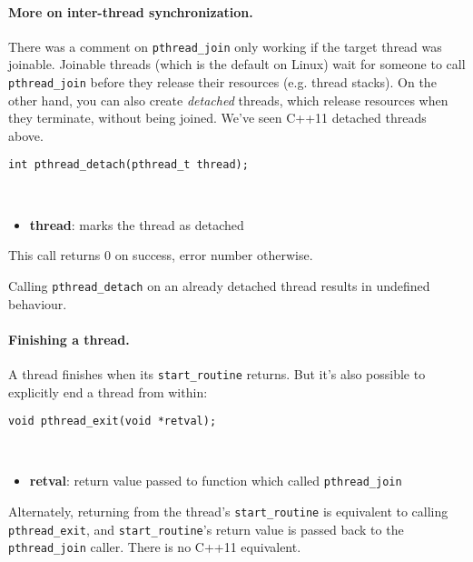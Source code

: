 \documentclass[11pt]{article}
\begin{document}
\paragraph{More on inter-thread synchronization.} There was a comment on {\tt pthread\_join}
only working if the target thread was joinable. Joinable threads
(which is the default on Linux) wait for someone to call {\tt pthread\_join}
before they release their resources (e.g. thread stacks). On the other
hand, you can also create \emph{detached} threads, which release
resources when they terminate, without being joined. We've seen C++11 detached
threads above.

\begin{lstlisting}
int pthread_detach(pthread_t thread);
\end{lstlisting}
~\vspace*{-3em}
\begin{itemize}
\item  {\bf thread}: marks the thread as detached
\end{itemize}

This call returns 0 on success, error number otherwise.

Calling {\tt pthread\_detach} on an already detached thread results in undefined
behaviour.

\paragraph{Finishing a thread.} A thread finishes when its {\tt start\_routine}
returns. But it's also possible to explicitly end a thread from within:

\begin{lstlisting}
void pthread_exit(void *retval);
\end{lstlisting}
~\vspace*{-3em}
\begin{itemize}
\item  {\bf retval}: return value passed to function which called {\tt pthread\_join}
\end{itemize}

Alternately, returning from the thread's {\tt start\_routine} is equivalent
to calling {\tt pthread\_exit}, and {\tt start\_routine}'s return value
is passed back to the {\tt pthread\_join} caller. There is no C++11 equivalent.
\end{document}
